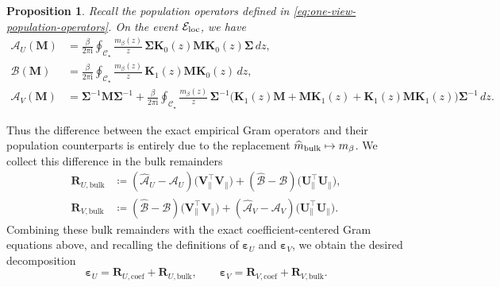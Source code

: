 \documentclass[11pt]{article}
\newtheorem{proposition}{Proposition}
\newcommand{\trans}{\top}
\newcommand{\cE}{\mathcal{E}}
\begin{document}
\begin{proposition}\label{prop:population-operator}
    Recall the population operators defined in \cref{eq:one-view-population-operators}. On the event $\cE_{\rm loc}$, we have 
    \begin{subequations}
\label{eq:one-view-population-contours}
\begin{align}
  \mathcal A_U(\bm M)
  &=
  \frac{\beta}{2\pi\mathrm i}
  \oint_{\mathcal C_\star}
  \frac{m_\beta(z)}{z}\,
  \bm\Sigma\bm K_0(z)
  \bm M
  \bm K_0(z)\bm\Sigma\,dz,
  \label{eq:one-view-population-AU-contour}\\
  \mathcal B(\bm M)
  &=
  \frac{\beta}{2\pi\mathrm i}
  \oint_{\mathcal C_\star}
  \frac{m_\beta(z)}{z}\,
  \bm K_1(z)\bm M\bm K_0(z)\,dz,
  \label{eq:one-view-population-B-contour}\\
  \mathcal A_V(\bm M)
  &=
  \bm\Sigma^{-1}\bm M\bm\Sigma^{-1}
  +
  \frac{\beta}{2\pi\mathrm i}
  \oint_{\mathcal C_\star}
  \frac{m_\beta(z)}{z}\,
  \bm\Sigma^{-1}
  \bigl(
    \bm K_1(z)\bm M
    +
    \bm M\bm K_1(z)
    +
    \bm K_1(z)\bm M\bm K_1(z)
  \bigr)
  \bm\Sigma^{-1}\,dz.
  \label{eq:one-view-population-AV-contour}
\end{align}
\end{subequations}
\end{proposition}

Thus the difference between the exact empirical Gram operators and their
population counterparts is entirely due to the replacement
$\widehat m_{\rm bulk}\mapsto m_\beta$.  We collect this difference in the bulk
remainders
\begin{subequations}
\label{eq:one-view-bulk-residuals}
\begin{align}
  \bm R_{U,\mathrm{bulk}}
  &\coloneqq
  (\widehat{\mathcal A}_U-\mathcal A_U)
  \bigl(
    \bm V_\parallel^\trans\bm V_\parallel
  \bigr)
  +
  (\widehat{\mathcal B}-\mathcal B)
  \bigl(
    \bm U_\parallel^\trans\bm U_\parallel
  \bigr),
  \label{eq:one-view-RU-bulk}\\
  \bm R_{V,\mathrm{bulk}}
  &\coloneqq
  (\widehat{\mathcal B}-\mathcal B)
  \bigl(
    \bm V_\parallel^\trans\bm V_\parallel
  \bigr)
  +
  (\widehat{\mathcal A}_V-\mathcal A_V)
  \bigl(
    \bm U_\parallel^\trans\bm U_\parallel
  \bigr).
  \label{eq:one-view-RV-bulk}
\end{align}
\end{subequations}
Combining these bulk remainders with the exact coefficient-centered Gram
equations above, and recalling the definitions of
$\bm\varepsilon_U$ and $\bm\varepsilon_V$, we obtain the desired
decomposition
\[
{\bm\varepsilon_U = \bm R_{U,\mathrm{coef}} + \bm R_{U,\mathrm{bulk}}, \qquad \bm\varepsilon_V = \bm R_{V,\mathrm{coef}} + \bm R_{V,\mathrm{bulk}}.}
\]
\end{document}
